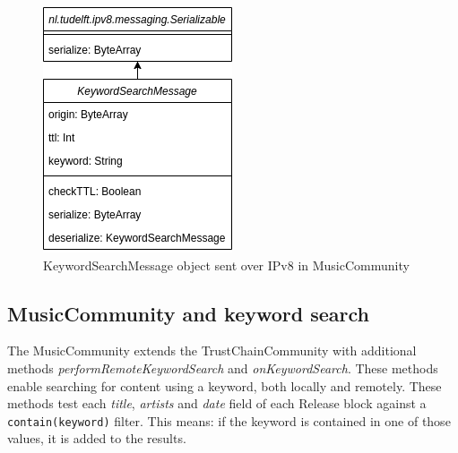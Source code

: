\begin{figure}
        \includegraphics[width=\linewidth]{implementation/keyword-search-message.png}
        \caption{KeywordSearchMessage object sent over IPv8 in MusicCommunity}
        \label{fig:keyword-search-message}
    \endminipage\hfill
    \endminipage
\end{figure}
\subsection{MusicCommunity and keyword search}
\label{sec:searching-musiccommunity-impl}
The MusicCommunity extends the TrustChainCommunity with additional methods \textit{performRemoteKeywordSearch} and \textit{onKeywordSearch}. These methods enable searching for content using a keyword, both locally and remotely. These methods test each \textit{title}, \textit{artists} and \textit{date} field of each Release block against a \verb|contain(keyword)| filter. This means: if the keyword is contained in one of those values, it is added to the results.

